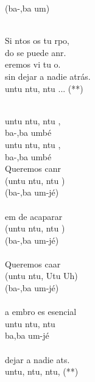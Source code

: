 \begin{cancion}
	(ba-,ba um)\\\jump\\
	\begin{chorus}%
	Si ntos os tu rpo,\\
	do se puede anr.\\
	eremos vi tu o. \\
sin dejar a nadie atrás.\\
	untu ntu, ntu ... (**)\\
	\end{chorus}%
	\jump\\
	untu ntu, ntu ,\\
	ba-,ba umbé\\
	untu ntu, ntu ,\\
	ba-,ba umbé\\
	Queremos canr\\
	(untu ntu, ntu )\\
	(ba-,ba um-jé)\\
\jump\\
	em de acaparar\\
	(untu ntu, ntu )\\
	(ba-,ba um-jé)\\
\jump\\
	Queremos caar\\
	(untu ntu, Utu Uh)\\
	(ba-,ba um-jé)\\
\jump\\
	a embro es esencial\\
	untu ntu, ntu \\
	ba,ba um-jé\\
\jump\\
	 dejar a nadie ats. \\
	untu, ntu, ntu,  (**)\\
\end{cancion}%
